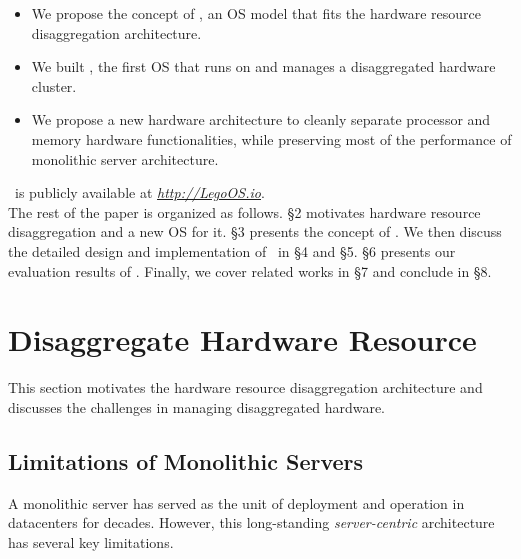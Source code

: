 \documentclass[10pt,times,twocolumn]{z2-article}
\begin{document}
\begin{itemize}

\vspace{-0.05in}
\item We propose the concept of \splitkernel, an OS model that fits the hardware resource disaggregation architecture.

\vspace{-0.05in}
\item We built \lego, the first OS that runs on and manages a disaggregated hardware cluster.

\vspace{-0.05in}
\item We propose a new hardware architecture to cleanly separate processor and memory hardware functionalities, 
while preserving most of the performance of monolithic server architecture.


\vspace{-0.05in}

\end{itemize}

\lego\ is publicly available at {\small {\em {\url{http://LegoOS.io}}}}.\\

The rest of the paper is organized as follows.
\S{}2 motivates hardware resource disaggregation and a new OS for it.
\S{}3 presents the concept of \splitkernel.
We then discuss the detailed design and implementation of \lego\ in \S{}4 and \S{}5.
\S{}6 presents our evaluation results of \lego.
Finally, we cover related works in \S{}7 and conclude in \S{}8.
\section{Disaggregate Hardware Resource}
\label{sec:motivation}

This section %
motivates the hardware resource disaggregation architecture
and discusses the challenges in managing disaggregated hardware.

\subsection{Limitations of Monolithic Servers}
\label{sec:monolimit}
A monolithic server has served as the unit of deployment and operation in datacenters
for decades. %
However, this long-standing {\em server-centric} architecture has several key limitations.
\end{document}

